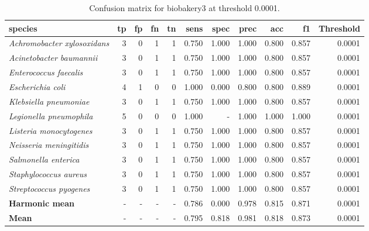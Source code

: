 \begin{table}[H]
\centering
\begin{tabular}{lrrrrrrrrrr}
\hline
\textbf{species} & \textbf{tp} & \textbf{fp} & \textbf{fn} & \textbf{tn} & \textbf{sens} & \textbf{spec} & \textbf{prec} & \textbf{acc} & \textbf{f1} & \textbf{Threshold} \\
\hline
\itshape Achromobacter xylosoxidans & 3 & 0 & 1 & 1 & 0.750 & 1.000 & 1.000 & 0.800 & 0.857 & 0.0001 \\
\itshape Acinetobacter baumannii & 3 & 0 & 1 & 1 & 0.750 & 1.000 & 1.000 & 0.800 & 0.857 & 0.0001 \\
\itshape Enterococcus faecalis & 3 & 0 & 1 & 1 & 0.750 & 1.000 & 1.000 & 0.800 & 0.857 & 0.0001 \\
\itshape Escherichia coli & 4 & 1 & 0 & 0 & 1.000 & 0.000 & 0.800 & 0.800 & 0.889 & 0.0001 \\
\itshape Klebsiella pneumoniae & 3 & 0 & 1 & 1 & 0.750 & 1.000 & 1.000 & 0.800 & 0.857 & 0.0001 \\
\itshape Legionella pneumophila & 5 & 0 & 0 & 0 & 1.000 & - & 1.000 & 1.000 & 1.000 & 0.0001 \\
\itshape Listeria monocytogenes & 3 & 0 & 1 & 1 & 0.750 & 1.000 & 1.000 & 0.800 & 0.857 & 0.0001 \\
\itshape Neisseria meningitidis & 3 & 0 & 1 & 1 & 0.750 & 1.000 & 1.000 & 0.800 & 0.857 & 0.0001 \\
\itshape Salmonella enterica & 3 & 0 & 1 & 1 & 0.750 & 1.000 & 1.000 & 0.800 & 0.857 & 0.0001 \\
\itshape Staphylococcus aureus & 3 & 0 & 1 & 1 & 0.750 & 1.000 & 1.000 & 0.800 & 0.857 & 0.0001 \\
\itshape Streptococcus pyogenes & 3 & 0 & 1 & 1 & 0.750 & 1.000 & 1.000 & 0.800 & 0.857 & 0.0001 \\
\bfseries Harmonic mean & - & - & - & - & 0.786 & 0.000 & 0.978 & 0.815 & 0.871 & 0.0001 \\
\bfseries Mean & - & - & - & - & 0.795 & 0.818 & 0.981 & 0.818 & 0.873 & 0.0001 \\
\end{tabular}
\caption{Confusion matrix for biobakery3 at threshold 0.0001.}
\label{tab:conf_biobakery3_0.0001}
\end{table}
